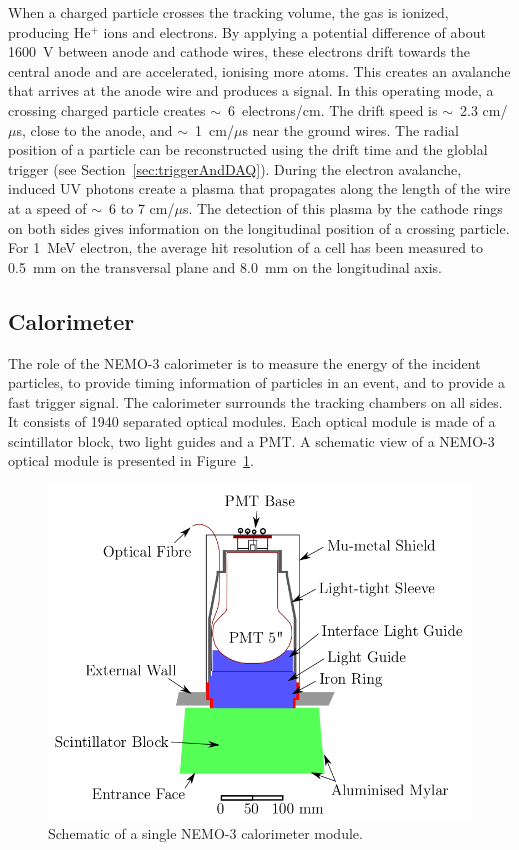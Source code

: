 \documentclass[main.tex]{subfiles}
\begin{document}
\NI When a charged particle crosses the tracking volume, the gas is ionized, producing He$^{+}$ ions and electrons. By applying a potential difference of about 1600~V between anode and cathode wires, these electrons drift towards the central anode and are accelerated, ionising more atoms. This creates an avalanche that arrives at the anode wire and produces a signal. In this operating mode, a crossing charged particle creates $\sim$~6~electrons/cm. The drift speed is $\sim$~2.3 cm/$\mu$s, close to the anode, and $\sim$~1~cm/$\mu$s near the ground wires. The radial position of a particle can be reconstructed using the drift time and the globlal trigger (see Section~\ref{sec:triggerAndDAQ}). During the electron avalanche, induced UV photons create a plasma that propagates along the length of the wire at a speed of $\sim$~6 to 7 cm/$\mu$s. The detection of this plasma by the cathode rings on both sides gives information on the longitudinal position of a crossing particle. For 1~MeV electron, the average hit resolution of a cell has been measured to 0.5~mm on the transversal plane and 8.0~mm on the longitudinal axis.


\subsection{Calorimeter}


\NI The role of the NEMO-3 calorimeter is to measure the energy of the incident particles, to provide timing information of particles in an event, and to provide a fast trigger signal. The calorimeter surrounds the tracking chambers on all sides. It consists of 1940 separated optical modules. Each optical module is made of a scintillator block, two light guides and a PMT. A schematic view of a NEMO-3 optical module is presented in Figure~\ref{CaloModuleNEMO3}.	


\bigskip

\begin{figure}[h!]
\begin{center}
\includegraphics[scale=0.40]{pictures/Chap3/CaloModuleNEMO3.png}
\caption{Schematic of a single NEMO-3 calorimeter module.}
\label{CaloModuleNEMO3}
\end{center}
\end{figure}
\end{document}
